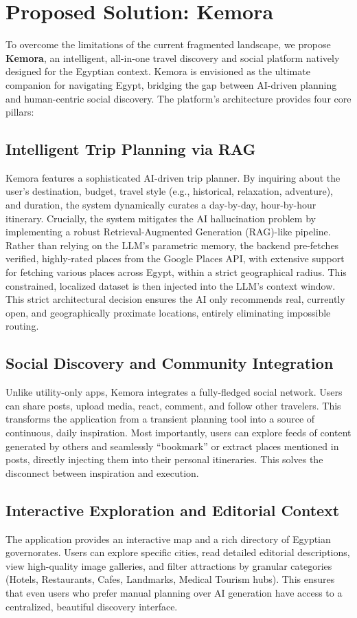 \section{Proposed Solution: Kemora}
To overcome the limitations of the current fragmented landscape, we propose \textbf{Kemora}, an intelligent, all-in-one travel discovery and social platform natively designed for the Egyptian context. Kemora is envisioned as the ultimate companion for navigating Egypt, bridging the gap between AI-driven planning and human-centric social discovery. The platform’s architecture provides four core pillars:

\subsection{Intelligent Trip Planning via RAG}
Kemora features a sophisticated AI-driven trip planner. By inquiring about the user's destination, budget, travel style (e.g., historical, relaxation, adventure), and duration, the system dynamically curates a day-by-day, hour-by-hour itinerary. Crucially, the system mitigates the AI hallucination problem by implementing a robust Retrieval-Augmented Generation (RAG)-like pipeline. Rather than relying on the LLM's parametric memory, the backend pre-fetches verified, highly-rated places from the Google Places API, with extensive support for fetching various places across Egypt, within a strict geographical radius. This constrained, localized dataset is then injected into the LLM's context window. This strict architectural decision ensures the AI only recommends real, currently open, and geographically proximate locations, entirely eliminating impossible routing.

\subsection{Social Discovery and Community Integration}
Unlike utility-only apps, Kemora integrates a fully-fledged social network. Users can share posts, upload media, react, comment, and follow other travelers. This transforms the application from a transient planning tool into a source of continuous, daily inspiration. Most importantly, users can explore feeds of content generated by others and seamlessly ``bookmark'' or extract places mentioned in posts, directly injecting them into their personal itineraries. This solves the disconnect between inspiration and execution.

\subsection{Interactive Exploration and Editorial Context}
The application provides an interactive map and a rich directory of Egyptian governorates. Users can explore specific cities, read detailed editorial descriptions, view high-quality image galleries, and filter attractions by granular categories (Hotels, Restaurants, Cafes, Landmarks, Medical Tourism hubs). This ensures that even users who prefer manual planning over AI generation have access to a centralized, beautiful discovery interface.

